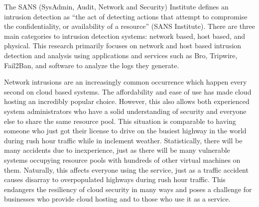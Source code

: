 \documentclass[./main.tex]{subfiles}
\begin{document}
The SANS (SysAdmin, Audit, Network and Security) Institute defines an intrusion detection as “the act of detecting actions that attempt to compromise the confidentiality, or availability of a resource” (SANS Institute). There are three main categories to intrusion detection systems: network based, host based, and physical. This research primarily focuses on network and host based intrusion detection and analysis using applications and services such as Bro, Tripwire, Fail2Ban, and software to analyze the logs they generate.

Network intrusions are an increasingly common occurrence which happen every second on cloud based systems. The affordability and ease of use has made cloud hosting an incredibly popular choice. However, this also allows both experienced system administrators who have a solid understanding of security and everyone else to share the same resource pool. This situation is comparable to having someone who just got their license to drive on the busiest highway in the world during rush hour traffic while in inclement weather. Statistically, there will be many accidents due to inexperience, just as there will be many vulnerable systems occupying resource pools with hundreds of other virtual machines on them. Naturally, this affects everyone using the service, just as a traffic accident causes disarray to overpopulated highways during rush hour traffic. This endangers the resiliency of cloud security in many ways and poses a challenge for businesses who provide cloud hosting and to those who use it as a service. 
\end{document}
